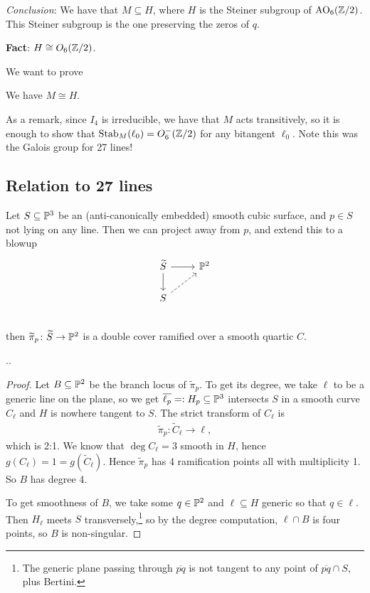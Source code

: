 \documentclass[11pt]{amsart}
\let\til\widetilde
\begin{document}
\emph{Conclusion}: We have that $M \subseteq H$, where $H$ is the Steiner subgroup of $\text{AO}_6(\Z/2)$. This Steiner subgroup is the one preserving the zeros of $q$.

\textbf{Fact}: $H \cong O_6(\Z/2)$.

We want to prove

\begin{theorem} We have $M \cong H$.
\end{theorem}

As a remark, since $I_4$ is irreducible, we have that $M$ acts transitively, so it is enough to show that $\Stab_M(\ell_0) = O_6^-(\Z/2)$ for any bitangent $\ell_0$. Note this was the Galois group for 27 lines!

\subsection{Relation to 27 lines}

Let $S \subseteq \P^3$ be an (anti-canonically embedded) smooth cubic surface, and $p \in S$ not lying on any line. Then we can project away from $p$, and extend this to a blowup
\[ \begin{tikzcd}
    \til{S}\rar\dar & \P^2\\
    S\ar[ur,dashed] & \\
\end{tikzcd} \]
then $\til{\pi}_p \colon \til{S} \to \P^2$ is a double cover ramified over a smooth quartic $C$.

\begin{lemma} ..
\end{lemma}
\begin{proof} Let $B \subseteq \P^2$ be the branch locus of $\til{\pi}_p$. To get its degree, we take $\ell$ to be a generic line on the plane, so we get $\overline{\ell_p} =: H_p \subseteq \P^3$ intersects $S$ in a smooth curve $C_\ell$ and $H$ is nowhere tangent to $S$. The strict transform of $C_\ell$ is
\begin{align*}
    \til{\pi}_p \colon \til{C}_\ell \to \ell,
\end{align*}
which is 2:1. We know that $\deg C_\ell = 3$ smooth in $H$, hence $g(C_\ell) = 1 = g(\til{C}_\ell)$. Hence $\tilde{\pi}_p$ has 4 ramification points all with multiplicity 1. So $B$ has degree 4.

To get smoothness of $B$, we take some $q\in \P^2$ and $\ell \subseteq H$ generic so that $q\in \ell$. Then $H_\ell$ meets $S$ transversely,\footnote{The generic plane passing through $\overline{pq}$ is not tangent to any point of $\overline{pq}\cap S$, plus Bertini.} so by the degree computation, $\ell\cap B$ is four points, so $B$ is non-singular.
\end{proof}
\end{document}

